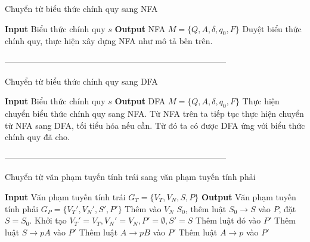 \documentclass[14pt]{extreport}
\begin{document}
\begin{algorithm}[H]
\caption{Chuyển từ biểu thức chính quy sang NFA}
\begin{algorithmic} 
\STATE \textbf{Input} Biểu thức chính quy $s$
\STATE \textbf{Output} NFA $M = \{Q, A, \delta, q_0, F\}$
\STATE Duyệt biểu thức chính quy, thực hiện xây dựng NFA như mô tả bên trên.
\end{algorithmic}
\end{algorithm}
--------------------------------------------------------------------------------\\
\begin{algorithm}[H]
\caption{Chuyển từ biểu thức chính quy sang DFA}
\begin{algorithmic} 
\STATE \textbf{Input} Biểu thức chính quy $s$
\STATE \textbf{Output} DFA $M = \{Q, A, \delta, q_0, F\}$
\STATE Thực hiện chuyển biểu thức chính quy sang NFA.
\STATE Từ NFA trên ta tiếp tục thực hiện chuyển từ NFA sang DFA, tối tiểu hóa nếu cần.
\STATE Từ đó ta có được DFA ứng với biểu thức chính quy đã cho.
\end{algorithmic}
\end{algorithm}
--------------------------------------------------------------------------------\\
\begin{algorithm}[H]
\caption{Chuyển từ văn phạm tuyến tính trái sang văn phạm tuyến tính phải}
\begin{algorithmic} 
\STATE \textbf{Input} Văn phạm tuyến tính trái $G_T = \{V_T, V_N, S, P\}$
\STATE \textbf{Output} Văn phạm tuyến tính phải $G_P = \{V_T', V_N', S', P'\}$
\STATE Thêm vào $V_N$ $S_0$, thêm luật $S_0 \rightarrow S$ vào $P$, đặt $S = S_0$.
\ENDIF
\STATE Khởi tạo $V_T' = V_T, V_N' = V_N, P' = \emptyset, S' = S$
\STATE Thêm luật đó vào $P'$
\STATE Thêm luật $S \rightarrow pA$ vào $P'$
\STATE Thêm luật $A \rightarrow pB$ vào $P'$
\STATE Thêm luật $A \rightarrow p$ vào $P'$
\ENDIF
\ENDFOR
\end{algorithmic}
\end{algorithm}
\end{document}
